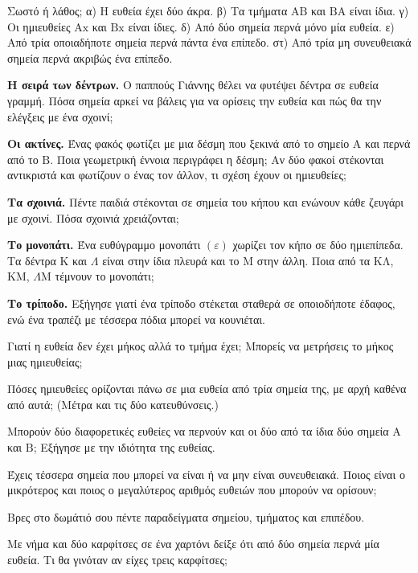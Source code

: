 \ex Σωστό ή λάθος; α) Η ευθεία έχει δύο άκρα. \quad β) Τα τμήματα $\mathrm{ΑΒ}$ και $\mathrm{ΒΑ}$ είναι ίδια. \quad γ) Οι ημιευθείες $\mathrm{Αx}$ και $\mathrm{Βx}$ είναι ίδιες. \quad δ) Από δύο σημεία περνά μόνο μία ευθεία. \quad ε) Από τρία οποιαδήποτε σημεία περνά πάντα ένα επίπεδο. \quad στ) Από τρία μη συνευθειακά σημεία περνά ακριβώς ένα επίπεδο.


\ex \textbf{Η σειρά των δέντρων.} Ο παππούς Γιάννης θέλει να φυτέψει δέντρα σε ευθεία γραμμή. Πόσα σημεία αρκεί να βάλεις για να ορίσεις την ευθεία και πώς θα την ελέγξεις με ένα σχοινί;

\ex \textbf{Οι ακτίνες.} Ένας φακός φωτίζει με μια δέσμη που ξεκινά από το σημείο $\mathrm{Α}$ και περνά από το $\mathrm{Β}$. Ποια γεωμετρική έννοια περιγράφει η δέσμη; Αν δύο φακοί στέκονται αντικριστά και φωτίζουν ο ένας τον άλλον, τι σχέση έχουν οι ημιευθείες;

\ex \textbf{Τα σχοινιά.} Πέντε παιδιά στέκονται σε σημεία του κήπου και ενώνουν κάθε ζευγάρι με σχοινί. Πόσα σχοινιά χρειάζονται;

\ex \textbf{Το μονοπάτι.} Ένα ευθύγραμμο μονοπάτι $(\varepsilon)$ χωρίζει τον κήπο σε δύο ημιεπίπεδα. Τα δέντρα $\mathrm{Κ}$ και $\Lambda$ είναι στην ίδια πλευρά και το $\mathrm{Μ}$ στην άλλη. Ποια από τα $\mathrm{ΚΛ}$, $\mathrm{ΚΜ}$, $\Lambda\mathrm{Μ}$ τέμνουν το μονοπάτι;

\ex \textbf{Το τρίποδο.} Εξήγησε γιατί ένα τρίποδο στέκεται σταθερά σε οποιοδήποτε έδαφος, ενώ ένα τραπέζι με τέσσερα πόδια μπορεί να κουνιέται.


\ex Γιατί η ευθεία δεν έχει μήκος αλλά το τμήμα έχει; Μπορείς να μετρήσεις το μήκος μιας ημιευθείας;

\ex Πόσες ημιευθείες ορίζονται πάνω σε μια ευθεία από τρία σημεία της, με αρχή καθένα από αυτά; (Μέτρα και τις δύο κατευθύνσεις.)

\ex Μπορούν δύο διαφορετικές ευθείες να περνούν και οι δύο από τα ίδια δύο σημεία $\mathrm{Α}$ και $\mathrm{Β}$; Εξήγησε με την ιδιότητα της ευθείας.

\ex Έχεις τέσσερα σημεία που μπορεί να είναι ή να μην είναι συνευθειακά. Ποιος είναι ο μικρότερος και ποιος ο μεγαλύτερος αριθμός ευθειών που μπορούν να ορίσουν;


\ex Βρες στο δωμάτιό σου πέντε παραδείγματα σημείου, τμήματος και επιπέδου.

\ex Με νήμα και δύο καρφίτσες σε ένα χαρτόνι δείξε ότι από δύο σημεία περνά μία ευθεία. Τι θα γινόταν αν είχες τρεις καρφίτσες;
